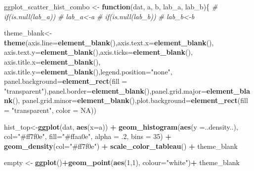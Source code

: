 \documentclass[]{article}
\newenvironment{Shaded}{\begin{snugshade}}{\end{snugshade}}
\newcommand{\CommentTok}[1]{\textcolor[rgb]{0.56,0.35,0.01}{\textit{#1}}}
\newcommand{\ControlFlowTok}[1]{\textcolor[rgb]{0.13,0.29,0.53}{\textbf{#1}}}
\newcommand{\DataTypeTok}[1]{\textcolor[rgb]{0.13,0.29,0.53}{#1}}
\newcommand{\DecValTok}[1]{\textcolor[rgb]{0.00,0.00,0.81}{#1}}
\newcommand{\FloatTok}[1]{\textcolor[rgb]{0.00,0.00,0.81}{#1}}
\newcommand{\KeywordTok}[1]{\textcolor[rgb]{0.13,0.29,0.53}{\textbf{#1}}}
\newcommand{\NormalTok}[1]{#1}
\newcommand{\OperatorTok}[1]{\textcolor[rgb]{0.81,0.36,0.00}{\textbf{#1}}}
\newcommand{\OtherTok}[1]{\textcolor[rgb]{0.56,0.35,0.01}{#1}}
\newcommand{\StringTok}[1]{\textcolor[rgb]{0.31,0.60,0.02}{#1}}
\begin{document}
\begin{Shaded}
\begin{Highlighting}[]
\NormalTok{ggplot_scatter_hist_combo <-}\StringTok{ }\ControlFlowTok{function}\NormalTok{(dat, a, b, lab_a, lab_b)\{}
  \CommentTok{# if(is.null(lab_a))}
  \CommentTok{#   lab_a<-a}
  \CommentTok{# if(is.null(lab_b))}
  \CommentTok{#   lab_b<-b}

\NormalTok{  theme_blank<-}\StringTok{ }\KeywordTok{theme}\NormalTok{(}\DataTypeTok{axis.line=}\KeywordTok{element_blank}\NormalTok{(),}\DataTypeTok{axis.text.x=}\KeywordTok{element_blank}\NormalTok{(),}
                      \DataTypeTok{axis.text.y=}\KeywordTok{element_blank}\NormalTok{(),}\DataTypeTok{axis.ticks=}\KeywordTok{element_blank}\NormalTok{(),}
                      \DataTypeTok{axis.title.x=}\KeywordTok{element_blank}\NormalTok{(),}
                      \DataTypeTok{axis.title.y=}\KeywordTok{element_blank}\NormalTok{(),}\DataTypeTok{legend.position=}\StringTok{"none"}\NormalTok{,}
                      \DataTypeTok{panel.background=}\KeywordTok{element_rect}\NormalTok{(}\DataTypeTok{fill =} \StringTok{"transparent"}\NormalTok{),}\DataTypeTok{panel.border=}\KeywordTok{element_blank}\NormalTok{(),}\DataTypeTok{panel.grid.major=}\KeywordTok{element_blank}\NormalTok{(),}
                      \DataTypeTok{panel.grid.minor=}\KeywordTok{element_blank}\NormalTok{(),}\DataTypeTok{plot.background=}\KeywordTok{element_rect}\NormalTok{(}\DataTypeTok{fill =} \StringTok{"transparent"}\NormalTok{, }\DataTypeTok{color =} \OtherTok{NA}\NormalTok{))}
  
\NormalTok{  hist_top<-}\KeywordTok{ggplot}\NormalTok{(dat, }\KeywordTok{aes}\NormalTok{(}\DataTypeTok{x=}\NormalTok{a)) }\OperatorTok{+}\StringTok{ }
\StringTok{    }\KeywordTok{geom_histogram}\NormalTok{(}\KeywordTok{aes}\NormalTok{(}\DataTypeTok{y =}\NormalTok{..density..), }
                   \DataTypeTok{col=}\StringTok{"#ff7f0e"}\NormalTok{, }
                   \DataTypeTok{fill=}\StringTok{"#ffaa0e"}\NormalTok{, }
                   \DataTypeTok{alpha =} \FloatTok{.2}\NormalTok{,}
                   \DataTypeTok{bins =} \DecValTok{35}\NormalTok{) }\OperatorTok{+}\StringTok{ }
\StringTok{    }\KeywordTok{geom_density}\NormalTok{(}\DataTypeTok{col=}\StringTok{"#ff7f0e"}\NormalTok{) }\OperatorTok{+}\StringTok{ }
\StringTok{    }\KeywordTok{scale_color_tableau}\NormalTok{() }\OperatorTok{+}
\StringTok{    }\NormalTok{theme_blank}
  
\NormalTok{  empty <-}\StringTok{ }\KeywordTok{ggplot}\NormalTok{()}\OperatorTok{+}\KeywordTok{geom_point}\NormalTok{(}\KeywordTok{aes}\NormalTok{(}\DecValTok{1}\NormalTok{,}\DecValTok{1}\NormalTok{), }\DataTypeTok{colour=}\StringTok{"white"}\NormalTok{)}\OperatorTok{+}
\StringTok{    }\NormalTok{theme_blank}
  

\end{Highlighting}
\end{Shaded}
\end{document}
